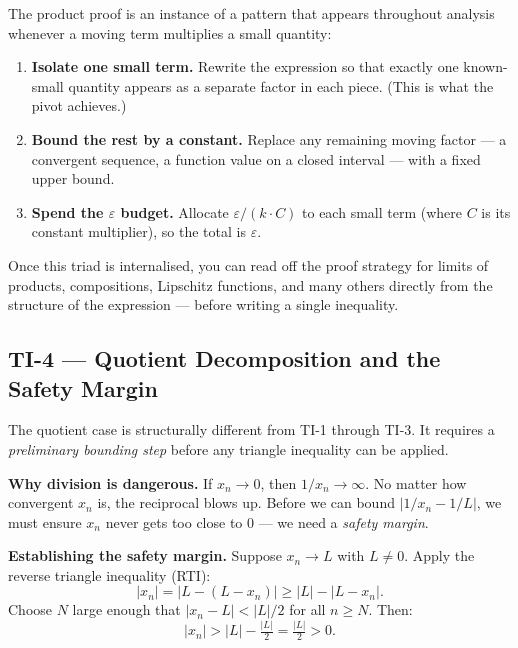\begin{tcolorbox}[colback=gray!6, colframe=gray!40, arc=2pt,
  left=8pt, right=8pt, top=6pt, bottom=6pt,
  title={\small\textbf{The Reusable Triad (applies beyond products)}},
  fonttitle=\small\bfseries]
The product proof is an instance of a pattern that appears throughout
analysis whenever a moving term multiplies a small quantity:
\begin{enumerate}
  \item \textbf{Isolate one small term.}
        Rewrite the expression so that exactly one known-small
        quantity appears as a separate factor in each piece.
        (This is what the pivot achieves.)
  \item \textbf{Bound the rest by a constant.}
        Replace any remaining moving factor — a convergent sequence,
        a function value on a closed interval — with a fixed upper bound.
  \item \textbf{Spend the $\varepsilon$ budget.}
        Allocate $\varepsilon/(k \cdot C)$ to each small term
        (where $C$ is its constant multiplier), so the total is $\varepsilon$.
\end{enumerate}
\medskip
Once this triad is internalised, you can read off the proof strategy
for limits of products, compositions, Lipschitz functions, and many
others directly from the structure of the expression — before
writing a single inequality.
\end{tcolorbox}

\subsection{TI-4 — Quotient Decomposition and the Safety Margin}
\label{sec:safety-margin}

The quotient case is structurally different from TI-1 through TI-3.
It requires a \emph{preliminary bounding step} before any triangle
inequality can be applied.

\medskip

\noindent\textbf{Why division is dangerous.}
If $x_n \to 0$, then $1/x_n \to \infty$.
No matter how convergent $x_n$ is, the reciprocal blows up.
Before we can bound $|1/x_n - 1/L|$, we must ensure $x_n$ never
gets too close to $0$ — we need a \emph{safety margin}.

\medskip

\noindent\textbf{Establishing the safety margin.}
Suppose $x_n \to L$ with $L \ne 0$.
Apply the reverse triangle inequality (RTI):
\[
  |x_n|
  = |L - (L - x_n)|
  \ge |L| - |L - x_n|.
\]
Choose $N$ large enough that $|x_n - L| < |L|/2$ for all $n \ge N$.
Then:
\[
  |x_n| > |L| - \tfrac{|L|}{2} = \tfrac{|L|}{2} > 0.
\]

